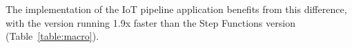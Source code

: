 The \name{} implementation of the IoT pipeline application benefits from this
difference, with the \name{} version running 1.9x faster than the Step Functions
version (Table~\ref{table:macro}).

%
%
%
%
%
%

